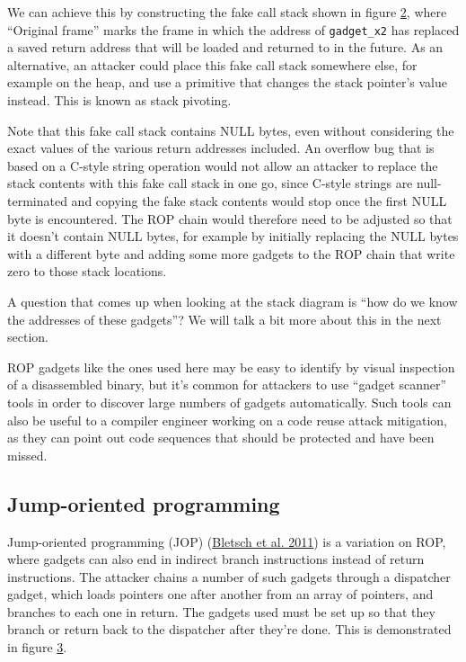 \documentclass[
  a4paper,
]{report}
\begin{document}
We can achieve this by constructing the fake call stack shown in figure
\protect\hyperlink{fig:rop-call-stack}{2}, where ``Original frame''
marks the frame in which the address of \texttt{gadget\_x2} has replaced
a saved return address that will be loaded and returned to in the
future. As an alternative, an attacker could place this fake call stack
somewhere else, for example on the heap, and use a primitive that
changes the stack pointer's value instead. This is known as stack
pivoting.

Note that this fake call stack contains NULL bytes, even without
considering the exact values of the various return addresses included.
An overflow bug that is based on a C-style string operation would not
allow an attacker to replace the stack contents with this fake call
stack in one go, since C-style strings are null-terminated and copying
the fake stack contents would stop once the first NULL byte is
encountered. The ROP chain would therefore need to be adjusted so that
it doesn't contain NULL bytes, for example by initially replacing the
NULL bytes with a different byte and adding some more gadgets to the ROP
chain that write zero to those stack locations.

A question that comes up when looking at the stack diagram is ``how do
we know the addresses of these gadgets''? We will talk a bit more about
this in the next section.

ROP gadgets like the ones used here may be easy to identify by visual
inspection of a disassembled binary, but it's common for attackers to
use ``gadget scanner'' tools in order to discover
large numbers of gadgets automatically. Such tools can also be useful to
a compiler engineer working on a code reuse attack mitigation, as they
can point out code sequences that should be protected and have been
missed.

\hypertarget{jump-oriented-programming}{%
\subsection{Jump-oriented programming}\label{jump-oriented-programming}}

Jump-oriented programming (JOP)
(\protect\hyperlink{ref-Bletsch2011}{Bletsch et al. 2011}) is a
variation on ROP, where gadgets can also end in indirect branch
instructions instead of return instructions. The attacker chains a
number of such gadgets through a dispatcher
gadget, which loads pointers one after another
from an array of pointers, and branches to each one in return. The
gadgets used must be set up so that they branch or return back to the
dispatcher after they're done. This is demonstrated in figure
\protect\hyperlink{fig:jop}{3}.
\end{document}
